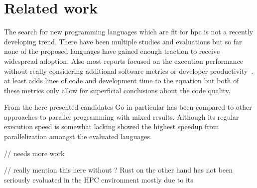 \section{Related work}
\label{sec:Introduction::Related}

The search for new programming languages which are fit for \gls{hpc} is not a recently developing trend. There have been multiple studies and evaluations but so far none of the proposed languages have gained enough traction to receive widespread adoption. Also most reports focused on the execution performance without really considering additional software metrics or developer productivity~\cite{related_multicore}. at least adds lines of code and development time to the equation but both of these metrics only allow for superficial conclusions about the code quality.

From the here presented candidates Go in particular has been compared to other approaches to parallel programming with mixed results. Although its regular execution speed is somewhat lacking \cite{related_sor_study} showed the highest speedup from parallelization amongst the evaluated languages.

// needs more work

// really mention this here without ?
Rust on the other hand has not been seriously evaluated in the HPC environment mostly due to its
